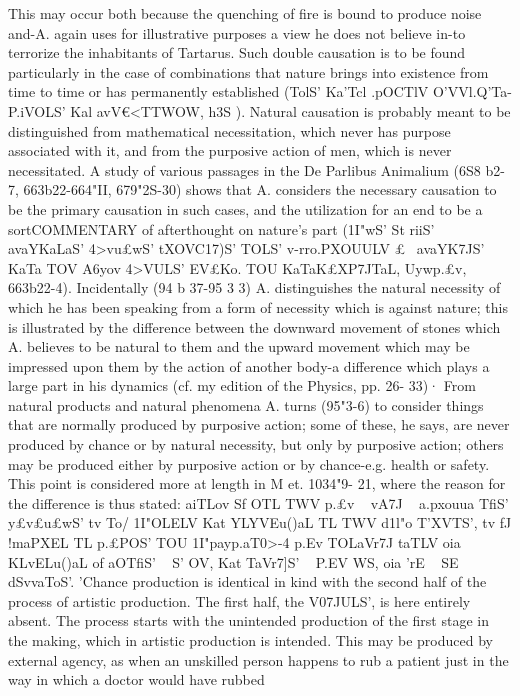{{{{{{{{{{{{{{{{{{{{{{{{{{{{{{{{{{{{{{{{{{{{{{{{{{{{{{{{{{{{This may occur both because the quenching of fire is bound to
produce noise and-A. again uses for illustrative purposes a view
he does not believe in-to terrorize the inhabitants of Tartarus.
Such double causation is to be found particularly in the case
of combinations that nature brings into existence from time to
time or has permanently established (TolS' Ka'Tcl .pOCTlV O'VVl.Q'Ta-
P.iVOLS' Kal avV€<TTWOW, h3S ). Natural causation is probably meant
to be distinguished from mathematical necessitation, which never
has purpose associated with it, and from the purposive action of
men, which is never necessitated. A study of various passages
in the De Parlibus Animalium (6S8 b2-7, 663b22-664"II, 679"2S-30)
shows that A. considers the necessary causation to be the primary
causation in such cases, and the utilization for an end to be a sortCOMMENTARY
of afterthought on nature's part (1I"wS' St riiS' avaYKaLaS' 4>vu£wS'
tXOVC17)S' TOLS' v-rro.PXOUULV £~ avaYK7JS' ~ KaTa TOV A6yov 4>VULS' EV£Ko.
TOU KaTaK£XP7JTaL, Uywp.£v, 663b22-4).
Incidentally (94 b 37-95 3 3) A. distinguishes the natural necessity
of which he has been speaking from a form of necessity which is
against nature; this is illustrated by the difference between the
downward movement of stones which A. believes to be natural
to them and the upward movement which may be impressed upon
them by the action of another body-a difference which plays a
large part in his dynamics (cf. my edition of the Physics, pp. 26-
33)·
From natural products and natural phenomena A. turns (95"3-6)
to consider things that are normally produced by purposive
action; some of these, he says, are never produced by chance or
by natural necessity, but only by purposive action; others may
be produced either by purposive action or by chance-e.g. health
or safety. This point is considered more at length in M et. 1034"9-
21, where the reason for the difference is thus stated: aiTLov Sf
OTL TWV p.£v ~ vA7J ~ a.pxouua TfiS' y£v£u£wS' tv To/ 1I"OLELV Kat YLYVEu()aL
TL TWV d1l"o T'XVT}S', tv fJ !maPXEL TL p.£POS' TOU 1I"payp.aT0>-4 p.Ev
TOLaVr7J taTLV oia KLvELu()aL of aOTfiS' ~ S' OV, Kat TaVr7]S' ~ P.EV WS,
oia 'rE ~ SE dSvvaToS'. 'Chance production is identical in kind with
the second half of the process of artistic production. The first
half, the V07JULS', is here entirely absent. The process starts with
the unintended production of the first stage in the making, which
in artistic production is intended. This may be produced by
external agency, as when an unskilled person happens to rub
a patient just in the way in which a doctor would have rubbed
}}}}}}}}}}}}}}}}}}}}}}}}}}}}}}}}}}}}}}}}}}}}}}}}}}}}}}}}}}}
